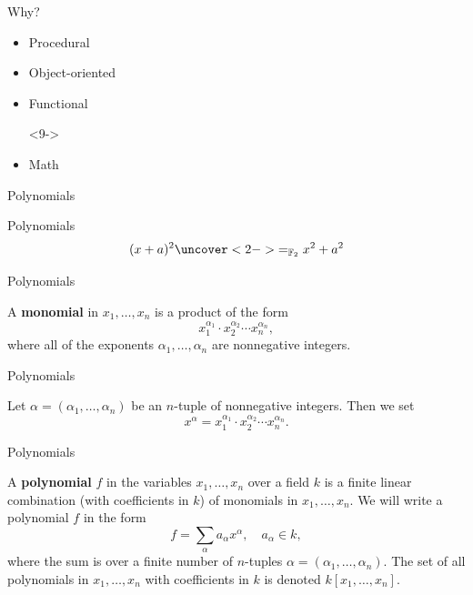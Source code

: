 \documentclass{beamer}
\def\bF{\mathbb{F}}
\begin{document}
\begin{frame}{Why?}
  \begin{itemize}
    \item Procedural  
    \item<2-> Object-oriented  
    \item<3-> Functional  
    \item[]<9->
    \item<9-> Math 
  \end{itemize}
\end{frame}

\begin{frame}{Polynomials}
\end{frame}

\begin{frame}{Polynomials}
  \[ (x+a)^2 \uncover<2->{=_{\bF_2}x^2+a^2} \]
\end{frame}

\begin{frame}{Polynomials}
  \begin{definition}
    A \textbf{monomial} in $x_1,\dots,x_n$ is a product of the form
    \[ x_1^{\alpha_1} \cdot x_2^{\alpha_2} \cdots x_n^{\alpha_n}, \]
    where all of the exponents $\alpha_1,\dots,\alpha_n$ are nonnegative integers.
  \end{definition}
\end{frame}

\begin{frame}{Polynomials}
  \begin{definition}
    Let $\alpha = (\alpha_1,\dots,\alpha_n)$ be an $n$-tuple of nonnegative integers. Then we set
    \[ x^\alpha = x_1^{\alpha_1} \cdot x_2^{\alpha_2} \cdots x_n^{\alpha_n}. \]
  \end{definition}
\end{frame}

\begin{frame}{Polynomials}
  \begin{definition}
    A \textbf{polynomial} $f$ in the variables $x_1,\dots,x_n$ over a field $k$ is a finite linear combination (with coefficients in $k$) of monomials in $x_1,\dots,x_n$. We will write a polynomial $f$ in the form
    \[ f = \sum_\alpha a_\alpha x^\alpha,\quad a_\alpha \in k, \]
    where the sum is over a finite number of $n$-tuples $\alpha = (\alpha_1,\dots,\alpha_n)$. The set of all polynomials in $x_1,\dots,x_n$ with coefficients in $k$ is denoted $k[x_1,\dots,x_n]$.
  \end{definition}
\end{frame}
\end{document}
